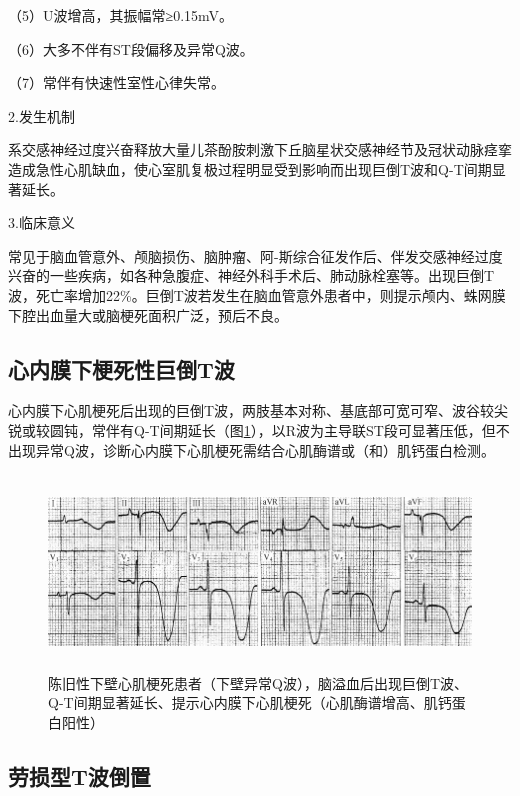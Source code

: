 （5）U波增高，其振幅常≥0.15mV。

（6）大多不伴有ST段偏移及异常Q波。

（7）常伴有快速性室性心律失常。

2.发生机制

系交感神经过度兴奋释放大量儿茶酚胺刺激下丘脑星状交感神经节及冠状动脉痉挛造成急性心肌缺血，使心室肌复极过程明显受到影响而出现巨倒T波和Q-T间期显著延长。

3.临床意义

常见于脑血管意外、颅脑损伤、脑肿瘤、阿-斯综合征发作后、伴发交感神经过度兴奋的一些疾病，如各种急腹症、神经外科手术后、肺动脉栓塞等。出现巨倒T波，死亡率增加22\%。巨倒T波若发生在脑血管意外患者中，则提示颅内、蛛网膜下腔出血量大或脑梗死面积广泛，预后不良。

\protect\hypertarget{text00012.htmlux5cux23subid90}{}{}

\subsection{心内膜下梗死性巨倒T波}

心内膜下心肌梗死后出现的巨倒T波，两肢基本对称、基底部可宽可窄、波谷较尖锐或较圆钝，常伴有Q-T间期延长（图\ref{fig6-3}），以R波为主导联ST段可显著压低，但不出现异常Q波，诊断心内膜下心肌梗死需结合心肌酶谱或（和）肌钙蛋白检测。

\begin{figure}[!htbp]
 \centering
 \includegraphics[width=5.78125in,height=2.03125in]{./images/Image00095.jpg}
 \captionsetup{justification=centering}
 \caption{陈旧性下壁心肌梗死患者（下壁异常Q波），脑溢血后出现巨倒T波、Q-T间期显著延长、提示心内膜下心肌梗死（心肌酶谱增高、肌钙蛋白阳性）}
 \label{fig6-3}
  \end{figure} 

\protect\hypertarget{text00012.htmlux5cux23subid91}{}{}

\subsection{劳损型T波倒置}

